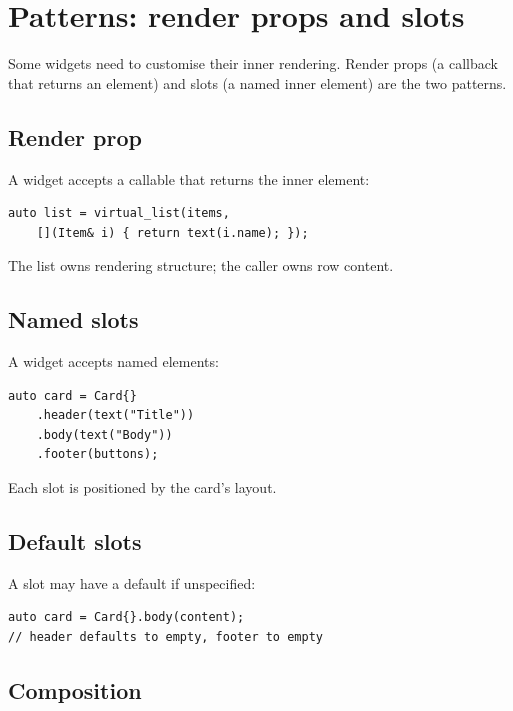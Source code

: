 \chapter{Patterns: render props and slots}
\label{ch:slots}

\begin{aside}
Some widgets need to customise their inner rendering. Render
props (a callback that returns an element) and slots (a named
inner element) are the two patterns.
\end{aside}

\section{Render prop}

A widget accepts a callable that returns the inner element:

\begin{lstlisting}
auto list = virtual_list(items,
    [](Item& i) { return text(i.name); });
\end{lstlisting}

The list owns rendering structure; the caller owns row
content.

\section{Named slots}

A widget accepts named elements:

\begin{lstlisting}
auto card = Card{}
    .header(text("Title"))
    .body(text("Body"))
    .footer(buttons);
\end{lstlisting}

Each slot is positioned by the card's layout.

\section{Default slots}

A slot may have a default if unspecified:

\begin{lstlisting}
auto card = Card{}.body(content);
// header defaults to empty, footer to empty
\end{lstlisting}

\section{Composition}

